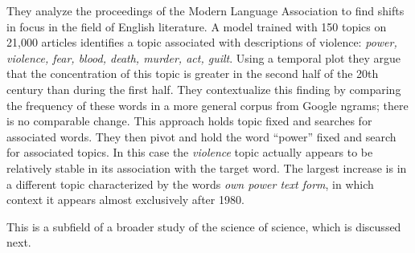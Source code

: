 They analyze the proceedings of the Modern Language Association to find shifts in focus in the field of English literature.
A model trained with 150 topics on 21,000 articles identifies a topic associated with descriptions of violence: {\em power,
violence, fear, blood, death, murder, act, guilt}. Using a temporal plot they argue that the concentration of this topic is greater in the second half of the 20th century than during the first half.
They contextualize this finding by comparing the frequency of these words in a more general corpus from Google ngrams; there is no comparable change.
This approach holds topic fixed and searches for associated words.
They then pivot and hold the word ``power'' fixed and search for associated topics.
In this case the {\em violence} topic actually appears to be relatively stable in its association with the target word. The largest increase is in a different topic characterized by the words {\em own power text form}, in which context it appears almost exclusively after 1980.

This is a subfield of a broader study of the science of science, which is discussed next.
